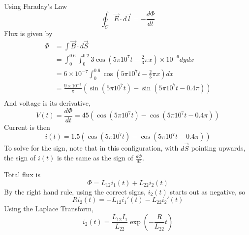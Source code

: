 \documentclass[answers]{exam}
\begin{document}
\begin{questions}
\begin{solution}
    Using Faraday's Law
    $$\oint_C \vec E \cdot d\vec l = -\frac{d\Phi}{dt}$$
    Flux is given by
    \begin{align*}
        \Phi &= \int \vec B \cdot d\vec S \\
             &= \int_0^{0.6} \int_0^{0.2} 3\cos\left(5\pi10^7t - \frac{2}{3}\pi x\right) \times 10^{-6} dydx \\
             &= 6\times10^{-7} \int_0^{0.6} \cos\left(5\pi10^7t - \frac{2}{3}\pi x\right) dx\\
             &= \frac{9\times10^{-7}}{\pi}(\sin(5\pi10^7t) - \sin(5\pi10^7t - 0.4\pi)) \\
    \end{align*}
    And voltage is its derivative,
    $$V(t) = \frac{d\Phi}{dt} = 45(\cos(5\pi10^7t) - \cos(5\pi10^7t - 0.4\pi))$$
    Current is then
    $$i(t) = 1.5(\cos(5\pi10^7t) - \cos(5\pi10^7t-0.4\pi))$$
    To solve for the sign, note that in this configuration, with $d\vec S$ pointing upwards, the sign of $i(t)$ is the same as the sign of $\frac{d\Phi}{dt}$.
\end{solution}


\begin{solution}
    Total flux is
    $$\Phi = L_{12}i_1(t) + L_{22}i_2(t)$$
    By the right hand rule, using the correct signs, $i_2(t)$ starts out as negative, so
    $$Ri_2(t) = -L_{12}i_1'(t) - L_{22}i_2'(t)$$
    Using the Laplace Transform,
    $$i_2(t) = \frac{L_{12}I_1}{L_{22}} \exp\left(-\frac{R}{L_{22}}t\right)$$
\end{solution}

\end{questions}
\end{document}
